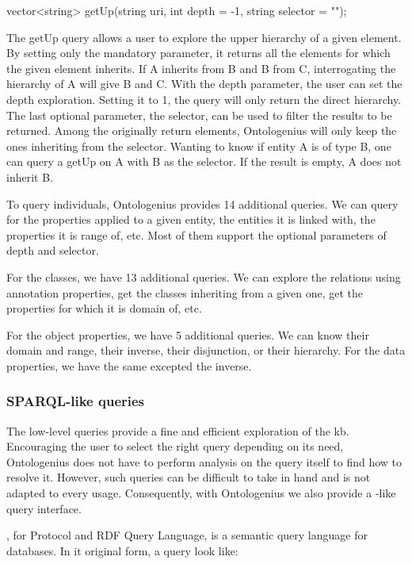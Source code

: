 \begin{verbatimtab}
vector<string> getUp(string uri,
                     int depth = -1, 
                     string selector = "");
\end{verbatimtab}

The getUp query allows a user to explore the upper hierarchy of a given element. By setting only the mandatory parameter, it returns all the elements for which the given element inherits. If A inherits from B and B from C, interrogating the hierarchy of A will give B and C. With the depth parameter, the user can set the depth exploration. Setting it to 1, the query will only return the direct hierarchy. The last optional parameter, the selector, can be used to filter the results to be returned. Among the originally return elements, Ontologenius will only keep the ones inheriting from the selector. Wanting to know if entity A is of type B, one can query a getUp on A with B as the selector. If the result is empty, A does not inherit B.

To query individuals, Ontologenius provides 14 additional queries. We can query for the properties applied to a given entity, the entities it is linked with, the properties it is range of, etc. Most of them support the optional parameters of depth and selector.

For the classes, we have 13 additional queries. We can explore the relations using annotation properties, get the classes inheriting from a given one, get the properties for which it is domain of, etc.

For the object properties, we have 5 additional queries. We can know their domain and range, their inverse, their disjunction, or their hierarchy. For the data properties, we have the same excepted the inverse.

\subsubsection{SPARQL-like queries}

The low-level queries provide a fine and efficient exploration of the \acrshort{kb}. Encouraging the user to select the right query depending on its need, Ontologenius does not have to perform analysis on the query itself to find how to resolve it. However, such queries can be difficult to take in hand and is not adapted to every usage. Consequently, with Ontologenius we also provide a \sparql{}-like query interface.

\sparql{}, for \sparql{} Protocol and RDF Query Language, is a semantic query language for databases. In it original form, a \sparql{} query look like:

